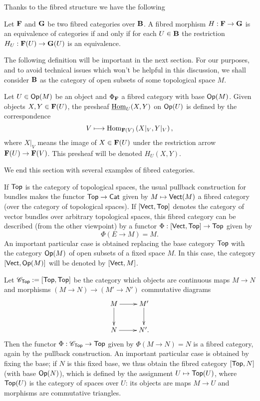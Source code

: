 Thanks to the fibred structure we have the following

\begin{proposition}
Let ${\bf F}$ and ${\bf G}$ be two fibred categories over ${\bf B}$. A fibred morphism $H:{\bf F}\to {\bf G}$ is an equivalence of categories if and only if for each $U\in {\bf B}$ the restriction $H_U:{\bf F}(U)\to {\bf G}(U)$ is an equivalence.
\end{proposition}

The following definition will be important in the next section. For our purposes, and to avoid technical issues which won't be helpful in this discussion, we shall consider ${\bf B}$ as the category of open subsets of some topological space $M$.

\begin{defi}\label{fcex_1}
Let $U\in \mathsf{Op}(M)$ be an object and $\Phi_{{\bf F}}$ a fibred category with base $\mathsf{Op}(M)$. Given objects $X,Y\in {\bf F}(U)$, the presheaf $\underline{\operatorname{Hom}}_U(X,Y)$ on $\mathsf{Op}(U)$ is defined by the correspondence
$$V\longmapsto \operatorname{Hom}_{{\bf F}(V)}\left (X|_V,Y|_V\right ),$$
where $X|_V$ means the image of $X\in {\bf F}(U)$ under the restriction arrow ${\bf F}(U)\to {\bf F}(V)$. This presheaf will be denoted $H_U(X,Y)$.
\end{defi}

We end this section with several examples of fibred categories. 

\begin{ej}\label{fcex_2}
If $\mathsf{Top}$ is the category of topological spaces, the usual pullback construction for bundles makes the functor $\mathsf{Top}\to \mathsf{Cat}$ given by $M\mapsto \mathsf{Vect}(M)$ a fibred category (over the category of topological spaces). If $[\mathsf{Vect},\mathsf{Top}]$ denotes the category of vector bundles over arbitrary topological spaces, this fibred category can be described (from the other viewpoint) by a functor $\Phi :[\mathsf{Vect},\mathsf{Top}]\to \mathsf{Top}$ given by
$$\Phi (E\to M)=M.$$
An important particular case is obtained replacing the base category $\mathsf{Top}$ with the category $\mathsf{Op}(M)$ of open subsets of a fixed space $M$. In this case, the category $[\mathsf{Vect},\mathsf{Op}(M)]$ will be denoted by $[\mathsf{Vect},M]$.
\end{ej}

\begin{ej}\label{fcex_3}
Let $\mathscr{C}_{\mathsf{Top}}:=[\mathsf{Top},\mathsf{Top}]$ be the category which objects are continuous maps $M\to N$ and morphisms $(M\to N)\to(M'\to N')$ commutative diagrams
$$
\xymatrix{
M \ar[r] \ar[d] & M'\ar[d] \\
N \ar[r] & N'.}
$$
Then the functor $\Phi :\mathscr{C}_{\mathsf{Top}}\to \mathsf{Top}$ given by $\Phi (M\to N)=N$ is a fibred category, again by the pullback construction. An important particular case is obtained by fixing the base; if $N$ is this fixed base, we thus obtain the fibred category $[\mathsf{Top},N]$ (with base $\mathsf{Op}(N)$), which is defined by the assignment $U\mapsto \mathsf{Top}(U)$, where $\mathsf{Top}(U)$ is the category of spaces over $U$: its objects are maps $M\to U$ and morphisms are commutative triangles.
\end{ej}

